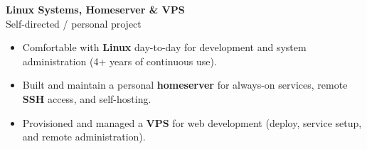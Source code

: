 \noindent
{\noindent\fontsize{12pt}{15pt}\bfseries Linux Systems, Homeserver \& VPS}\\
{\fontsize{9pt}{11pt}Self-directed / personal project}
\begin{itemize}
    \item Comfortable with \textbf{Linux} day-to-day for development and system administration (4+ years of continuous use).
    \item Built and maintain a personal \textbf{homeserver} for always-on services, remote \textbf{SSH} access, and self-hosting.
    \item Provisioned and managed a \textbf{VPS} for web development (deploy, service setup, and remote administration).
\end{itemize}
